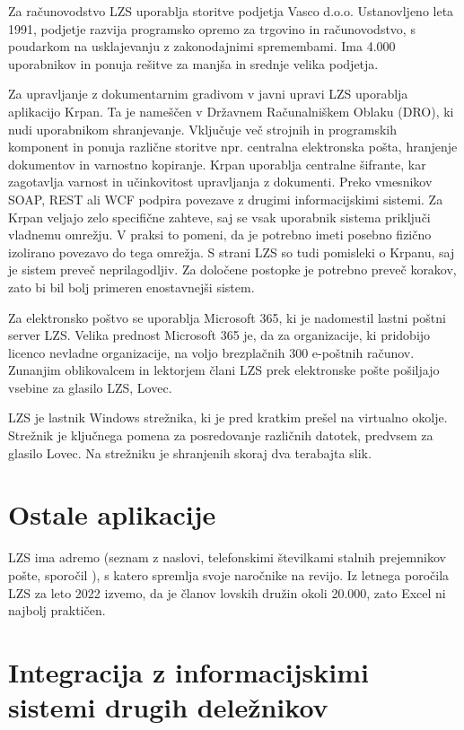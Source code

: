 \documentclass[a4paper,12pt,openright]{book}
\begin{document}
Za računovodstvo LZS uporablja storitve podjetja Vasco d.o.o.
Ustanovljeno leta 1991, podjetje razvija programsko opremo za trgovino in računovodstvo, s poudarkom na usklajevanju z zakonodajnimi spremembami. 
Ima 4.000 uporabnikov in ponuja rešitve za manjša in srednje velika podjetja. \cite{vasco}

Za upravljanje z dokumentarnim gradivom v javni upravi LZS uporablja aplikacijo Krpan. 
Ta je nameščen v Državnem Računalniškem Oblaku (DRO), ki nudi uporabnikom shranjevanje. Vključuje več strojnih in programskih komponent in ponuja različne storitve npr. centralna elektronska pošta, hranjenje dokumentov in varnostno kopiranje.\cite{drzavni_oblak}
Krpan uporablja centralne šifrante, kar zagotavlja varnost in učinkovitost upravljanja z dokumenti.
Preko vmesnikov SOAP, REST ali WCF podpira povezave z drugimi informacijskimi sistemi.
Za Krpan veljajo zelo specifične zahteve, saj se vsak uporabnik sistema priključi vladnemu omrežju.\cite{krpan}
V praksi to pomeni, da je potrebno imeti posebno fizično izolirano povezavo do tega omrežja.
S strani LZS so tudi pomisleki o Krpanu, saj je sistem preveč neprilagodljiv.
Za določene postopke je potrebno preveč korakov, zato bi bil bolj primeren enostavnejši sistem. 

Za elektronsko poštvo se uporablja Microsoft 365, ki je nadomestil lastni poštni server LZS.
Velika prednost Microsoft 365 je, da za organizacije, ki pridobijo licenco nevladne organizacije, na voljo brezplačnih 300 e-poštnih računov.
Zunanjim oblikovalcem in lektorjem člani LZS prek elektronske pošte pošiljajo vsebine za glasilo LZS, Lovec.

LZS je lastnik Windows strežnika, ki je pred kratkim prešel na virtualno okolje.
Strežnik je ključnega pomena za posredovanje različnih datotek, predvsem za glasilo Lovec.
Na strežniku je shranjenih skoraj dva terabajta slik.


\section{Ostale aplikacije}

LZS ima adremo (seznam z naslovi, telefonskimi številkami stalnih prejemnikov pošte, sporočil \cite{fran}), s katero spremlja svoje naročnike na revijo. 
Iz letnega poročila LZS za leto 2022 izvemo, da je članov lovskih družin okoli 20.000, zato Excel ni najbolj praktičen.

\section{Integracija z informacijskimi sistemi drugih deležnikov}
\end{document}

